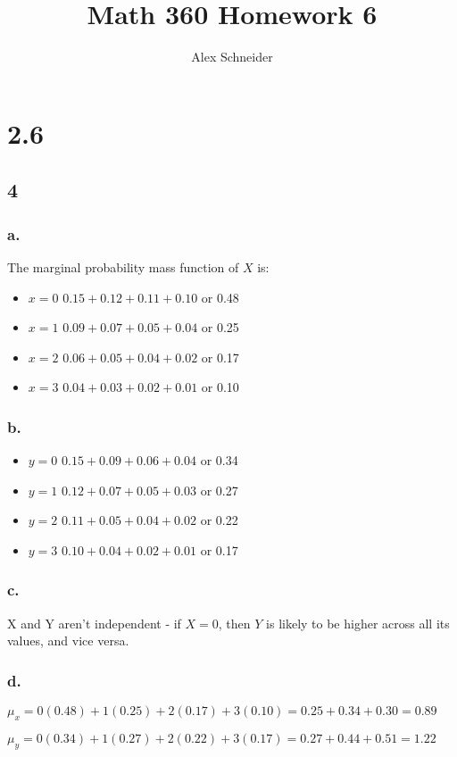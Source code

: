 \documentclass[11pt]{article}
\title{Math 360 Homework 6}
\author{Alex Schneider}
\begin{document}
\maketitle

\section{2.6}
\subsection{4}
\subsubsection{a.}
The marginal probability mass function of $X$ is:
\begin{itemize}
    \item $x=0$ $0.15+0.12+0.11+0.10$ or 0.48
    \item $x=1$ $0.09+0.07+0.05+0.04$ or 0.25
    \item $x=2$ $0.06+0.05+0.04+0.02$ or 0.17
    \item $x=3$ $0.04+0.03+0.02+0.01$ or 0.10
\end{itemize}

\subsubsection{b.}
\begin{itemize}
    \item $y=0$ $0.15+0.09+0.06+0.04$ or 0.34
    \item $y=1$ $0.12+0.07+0.05+0.03$ or 0.27
    \item $y=2$ $0.11+0.05+0.04+0.02$ or 0.22
    \item $y=3$ $0.10+0.04+0.02+0.01$ or 0.17
\end{itemize}

\subsubsection{c.}
X and Y aren't independent - if $X=0$, then $Y$ is likely to be higher across
all its values, and vice versa. 

\subsubsection{d.}
$\mu_x = 0(0.48)+1(0.25)+2(0.17)+3(0.10) = 0.25+0.34+0.30 = 0.89$

$\mu_y = 0(0.34)+1(0.27)+2(0.22)+3(0.17) = 0.27+0.44+0.51 = 1.22$
\end{document}
